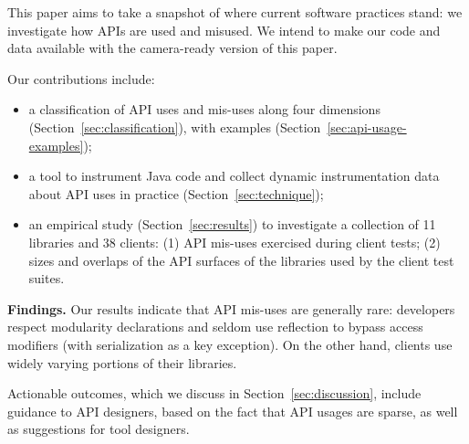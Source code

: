 

This paper aims to take a snapshot of where current software practices stand: we investigate how APIs are used and misused. 
We intend to make our code and data available with the camera-ready version of this paper.

Our contributions include:
\begin{itemize}
\item a classification of API uses and mis-uses along four dimensions (Section~\ref{sec:classification}), with examples (Section~\ref{sec:api-usage-examples});
\item a tool to instrument Java code and collect dynamic instrumentation data about API uses in practice (Section~\ref{sec:technique});
\item an empirical study (Section~\ref{sec:results}) to investigate a collection of 11 libraries and 38 clients: (1) API mis-uses exercised during client tests; (2) sizes and overlaps of the API surfaces of the libraries used by the client test suites.
\end{itemize}


{\bf Findings.} Our results indicate that API mis-uses are generally rare: developers respect modularity declarations and seldom use reflection to bypass access modifiers (with serialization as a key exception). On the other hand, clients use widely varying portions of their libraries.

Actionable outcomes, which we discuss in Section~\ref{sec:discussion}, include guidance to API designers, based on the fact that API usages are sparse, as well as suggestions for tool designers.
